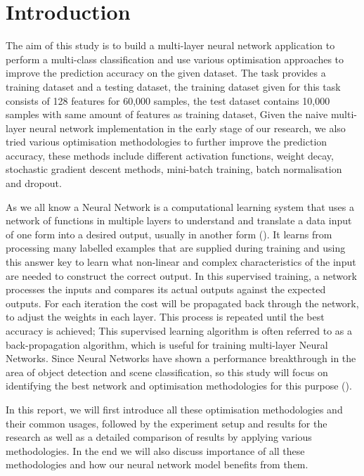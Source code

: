 \section{Introduction\label{chapter1}}

The aim of this study is to build a multi-layer neural network application to perform a multi-class classification and use various optimisation approaches to improve the prediction accuracy on the given dataset.
The task provides a training dataset and a testing dataset,
the training dataset given for this task consists of 128 features for 60,000 samples,
the test dataset contains 10,000 samples with same amount of features as training dataset,
Given the naive multi-layer neural network implementation in the early stage of our research,
we also tried various optimisation methodologies to further improve the prediction accuracy,
these methods include different activation functions, weight decay, stochastic gradient descent methods, mini-batch training, batch normalisation and dropout.

As we all know a Neural Network is a computational learning system that uses a network of functions in multiple layers to understand and translate a data input of one form into a desired output,
usually in another form (\citet{DeepAI}).
It learns from processing many labelled examples that are supplied during training and using this answer key to learn what non-linear and complex characteristics of the input are needed to construct the correct output.
In this supervised training,
a network processes the inputs and compares its actual outputs against the expected outputs.
For each iteration the cost will be propagated back through the network,
to adjust the weights in each layer.
This process is repeated until the best accuracy is achieved;
This supervised learning algorithm is often referred to as a back-propagation algorithm,
which is useful for training multi-layer Neural Networks.
Since Neural Networks have shown a performance breakthrough in the area of object detection and scene classification,
so this study will focus on identifying the best network and optimisation methodologies for this purpose (\citet{lecun1998Gradient}).

In this report, we will first introduce all these optimisation methodologies and their common usages,
followed by the experiment setup and results for the research as well as a detailed comparison of results by applying various methodologies.
In the end we will also discuss importance of all these methodologies and how our neural network model benefits from them.


